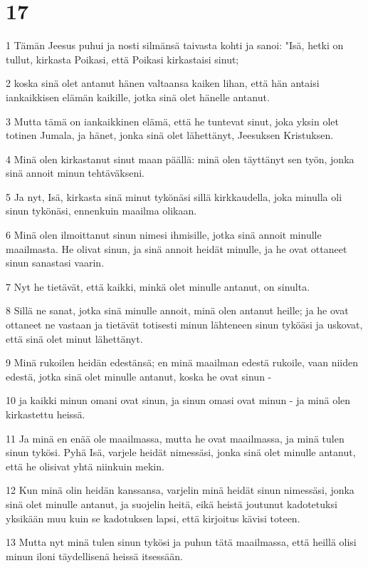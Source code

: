 \chapter{17}

\par 1 Tämän Jeesus puhui ja nosti silmänsä taivasta kohti ja sanoi: "Isä, hetki on tullut, kirkasta Poikasi, että Poikasi kirkastaisi sinut;
\par 2 koska sinä olet antanut hänen valtaansa kaiken lihan, että hän antaisi iankaikkisen elämän kaikille, jotka sinä olet hänelle antanut.
\par 3 Mutta tämä on iankaikkinen elämä, että he tuntevat sinut, joka yksin olet totinen Jumala, ja hänet, jonka sinä olet lähettänyt, Jeesuksen Kristuksen.
\par 4 Minä olen kirkastanut sinut maan päällä: minä olen täyttänyt sen työn, jonka sinä annoit minun tehtäväkseni.
\par 5 Ja nyt, Isä, kirkasta sinä minut tykönäsi sillä kirkkaudella, joka minulla oli sinun tykönäsi, ennenkuin maailma olikaan.
\par 6 Minä olen ilmoittanut sinun nimesi ihmisille, jotka sinä annoit minulle maailmasta. He olivat sinun, ja sinä annoit heidät minulle, ja he ovat ottaneet sinun sanastasi vaarin.
\par 7 Nyt he tietävät, että kaikki, minkä olet minulle antanut, on sinulta.
\par 8 Sillä ne sanat, jotka sinä minulle annoit, minä olen antanut heille; ja he ovat ottaneet ne vastaan ja tietävät totisesti minun lähteneen sinun tyköäsi ja uskovat, että sinä olet minut lähettänyt.
\par 9 Minä rukoilen heidän edestänsä; en minä maailman edestä rukoile, vaan niiden edestä, jotka sinä olet minulle antanut, koska he ovat sinun -
\par 10 ja kaikki minun omani ovat sinun, ja sinun omasi ovat minun - ja minä olen kirkastettu heissä.
\par 11 Ja minä en enää ole maailmassa, mutta he ovat maailmassa, ja minä tulen sinun tykösi. Pyhä Isä, varjele heidät nimessäsi, jonka sinä olet minulle antanut, että he olisivat yhtä niinkuin mekin.
\par 12 Kun minä olin heidän kanssansa, varjelin minä heidät sinun nimessäsi, jonka sinä olet minulle antanut, ja suojelin heitä, eikä heistä joutunut kadotetuksi yksikään muu kuin se kadotuksen lapsi, että kirjoitus kävisi toteen.
\par 13 Mutta nyt minä tulen sinun tykösi ja puhun tätä maailmassa, että heillä olisi minun iloni täydellisenä heissä itsessään.
